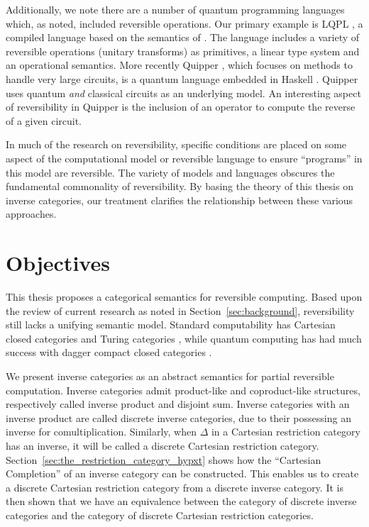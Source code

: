 Additionally, we note there are a number of quantum programming languages which, as noted, included
reversible operations. Our primary example is LQPL \cite{giles2007}, a compiled language based on the
semantics of \cite{selinger04:qpl}. The language includes a variety of reversible operations
(unitary transforms) as primitives, a linear type system and an operational semantics. More recently
Quipper \cite{green2013introduction,green2013quipper}, which focuses on methods to handle very large
circuits, is a quantum language embedded in Haskell \cite{peyton2003:haskell98}. Quipper uses quantum
\emph{and} classical circuits as an underlying model. An interesting aspect of reversibility in
Quipper is the inclusion of an operator to compute the reverse of a given circuit.

In much of the research on reversibility, specific conditions are placed on some aspect of the
computational model or reversible language to ensure ``programs'' in this model are reversible.
The variety of models and languages obscures the fundamental commonality of reversibility.
By basing the theory of this thesis on inverse categories, our treatment clarifies the relationship
between these various approaches.


\section{Objectives}
\label{sec:objectives}

This thesis proposes a categorical semantics for reversible computing. Based upon the review of
current research as noted in Section~\ref{sec:background}, reversibility still lacks a unifying
semantic model. Standard computability has Cartesian closed categories \cite{barr:ctcs} and Turing
categories \cite{cockett-hostra08-intro-to-turing}, while quantum computing has had much success
with dagger compact closed categories
\cite{selinger04:towardssemantics,selinger05:dagger,abramsky05:abstractscalars}.

We present inverse categories as an abstract semantics for partial reversible computation.
Inverse categories admit product-like and coproduct-like structures, respectively called
inverse product and disjoint sum. Inverse categories with an inverse product are called discrete
inverse categories, due to their possessing an inverse for comultiplication. Similarly, when
$\Delta$ in a Cartesian restriction category has an inverse, it will be called a discrete Cartesian
restriction category. Section~\ref{sec:the_restriction_category_hypxt} shows how the ``Cartesian
Completion'' of an inverse category can be constructed. This enables us to create a discrete
Cartesian restriction category from a discrete inverse category. It is then shown that we have an
equivalence between the category of discrete inverse categories and the category of discrete
Cartesian restriction categories.

